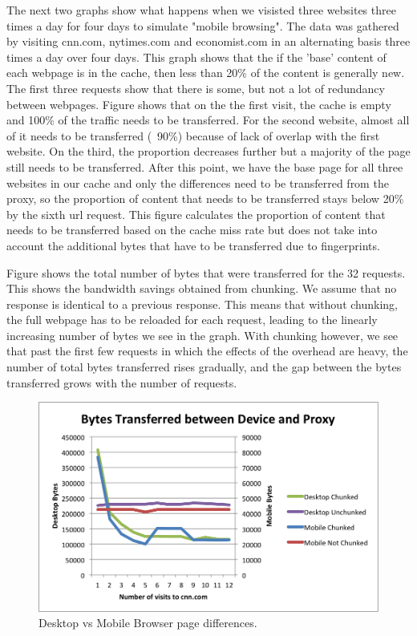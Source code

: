 The next two graphs show what happens when we visisted three websites three times a day for four days to simulate "mobile browsing". 
The data was gathered by visiting cnn.com, nytimes.com and economist.com in an alternating basis three times a day over four days. This graph shows that the if the 'base' content of each webpage is in the cache, then less than 20\% of the content is generally new. The first three requests show that there is some, but not a lot of redundancy between webpages.
Figure shows that on the the first visit, the cache is empty and 100\% of the traffic needs to be transferred. 
For the second website, almost all of it needs to be transferred (~90\%) because of lack of overlap with the first website. 
On the third, the proportion decreases further but a majority of the page still needs to be transferred. 
After this point, we have the base page for all three websites in our cache and only the differences need to be transferred from the proxy, so the proportion of content that needs to be transferred stays below 20\% by the sixth url request. 
This figure calculates the proportion of content that needs to be transferred based on the cache miss rate but does not take into account the additional bytes that have to be transferred due to fingerprints.

Figure shows the total number of bytes that were transferred for the 32 requests. This shows the bandwidth savings obtained from chunking.
We assume that no response is identical to a previous response. 
This means that without chunking, the full webpage has to be reloaded for each request, leading to the linearly increasing number of bytes we see in the graph. 
With chunking however, we see that past the first few requests in which the effects of the overhead are heavy, the number of total bytes transferred rises gradually, and the gap between the bytes transferred grows with the number of requests.


\begin{figure}[h] 
\centering \includegraphics[scale=0.40]{images/desktopmobile.png}
\caption{Desktop vs Mobile Browser page differences.}
\end{figure}

